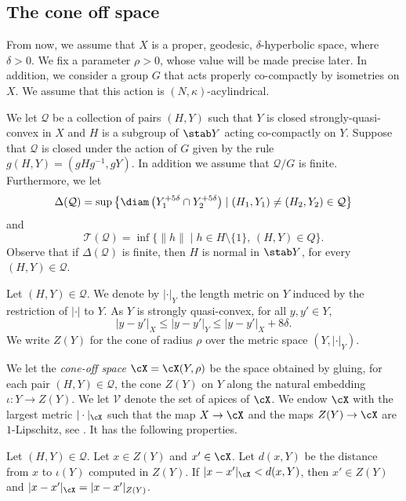 \subsection{The cone off space}
From now, we assume that $X$ is a proper, geodesic, $\delta$\nobreakdash-hyperbolic space, where $\delta >0$.
We fix a parameter $\rho > 0$, whose value will be made precise later.
In addition, we consider a group $G$ that acts properly co-compactly by isometries on $X$.
We assume that this action is $(N,\kappa)$-acylindrical.

We let $\mathcal Q$ be a collection of pairs $(H, Y) $ such that $Y$ is closed strongly-quasi-convex
in $X$ and $H$ is a subgroup of $\stab Y$ acting co-compactly on $Y$.
Suppose that $\mathcal Q$ is closed under the action of $G$ given by the rule $g(H,Y)=(gHg^{-1}, gY)$.
In addition we assume that $\mathcal Q/G$ is finite.
Furthermore, we let
\begin{equation*}
\Delta(\mathcal Q) = \sup \left\{ \diam \left( Y_1^{+5\delta} \cap Y_2^{+5\delta} \right) \mid (H_1, Y_1) \neq (H_2,Y_2) \in \mathcal Q\right\}
\end{equation*}
and
\begin{equation*}
\mathcal{T}(\mathcal Q)=\inf \{\| h \|\mid h\in H \setminus \{1\},\, (H,Y) \in Q\}.
\end{equation*}
Observe that if $\Delta(\mathcal Q)$ is finite, then $H$ is normal in $\stab Y$, for every $(H,Y) \in \mathcal Q$.

Let $(H,Y) \in \mathcal Q$. We denote by $|\cdot|_Y$ the length metric on $Y$ induced by the restriction of $|\cdot|$ to $Y$.
As $Y$ is strongly quasi-convex, for all $y,y' \in Y$,
\[
|y-y'|_X\leqslant |y-y'|_Y\leqslant |y-y'|_X+ 8\delta.
\]
We write $Z(Y)$ for the cone of radius $\rho$ over the metric space $(Y, |\cdot|_Y)$.

We let the \emph{cone-off space} $\cX= \cX (Y,\rho)$ be the space obtained by gluing, for each pair $(H,Y)\in \mathcal Q$, the cone $Z(Y)$ on $Y$ along the natural embedding $\iota: Y \to Z(Y)$.
We let $\mathcal V$ denote the set of apices of $\cX$.
We endow $\cX$ with the largest metric $|\cdot|_{\cX}$ such that the map $X\to \cX$ and the maps $Z(Y)\to \cX$ are $1$-Lipschitz, see \cite[\S 5.1]{coulon_geometry_2014}. It has the following properties.

\begin{lem}\label{L: metric cone off 2}
Let $(H,Y) \in \mathcal Q$.
Let $x \in Z(Y)$ and $x' \in \cX$.
Let $d(x,Y)$ be the distance from $x$ to $\iota(Y)$ computed in $Z(Y)$.
If $|x-x'|_{\cX} < d(x, Y)$, then $x' \in Z(Y)$ and $|x-x'|_{\cX} = |x-x'|_{Z(Y)}$.
\end{lem}

